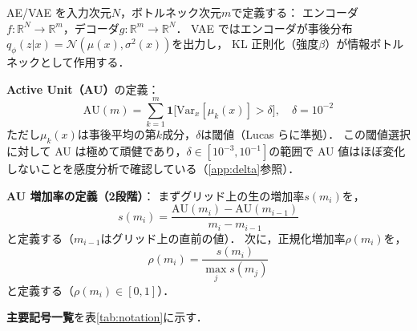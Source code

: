 \documentclass[11pt,a4paper]{jsarticle}
\newcommand{\R}{\mathbb{R}}
\begin{document}
AE/VAE を入力次元$N$，ボトルネック次元$m$で定義する：
エンコーダ$f: \R^N \to \R^m$，デコーダ$g: \R^m \to \R^N$．
VAE ではエンコーダが事後分布$q_\phi(z|x) = \mathcal{N}(\mu(x), \sigma^2(x))$を出力し，
KL 正則化（強度$\beta$）が情報ボトルネックとして作用する．

\textbf{Active Unit（AU）}の定義：
\begin{equation}
  \mathrm{AU}(m) = \sum_{k=1}^{m} \mathbf{1}\bigl[\mathrm{Var}_x[\mu_k(x)] > \delta\bigr],
  \quad \delta = 10^{-2}
  \label{eq:au_def}
\end{equation}
ただし$\mu_k(x)$は事後平均の第$k$成分，$\delta$は閾値（Lucas ら\cite{lucas2019elbo}に準拠）．
この閾値選択に対して AU は極めて頑健であり，$\delta \in [10^{-3}, 10^{-1}]$の範囲で AU 値はほぼ変化しないことを感度分析で確認している（\ref{app:delta}参照）．

\textbf{AU 増加率の定義（2段階）}：
まずグリッド上の生の増加率$s(m_i)$を，
\begin{equation}
  s(m_i) = \frac{\mathrm{AU}(m_i) - \mathrm{AU}(m_{i-1})}{m_i - m_{i-1}}
  \label{eq:au_raw_rate}
\end{equation}
と定義する（$m_{i-1}$はグリッド上の直前の値）．
次に，正規化増加率$\rho(m_i)$を，
\begin{equation}
  \rho(m_i) = \frac{s(m_i)}{\max_j s(m_j)}
  \label{eq:au_rate}
\end{equation}
と定義する（$\rho(m_i) \in [0, 1]$）．

\textbf{主要記号一覧}を表\ref{tab:notation}に示す．
\end{document}
